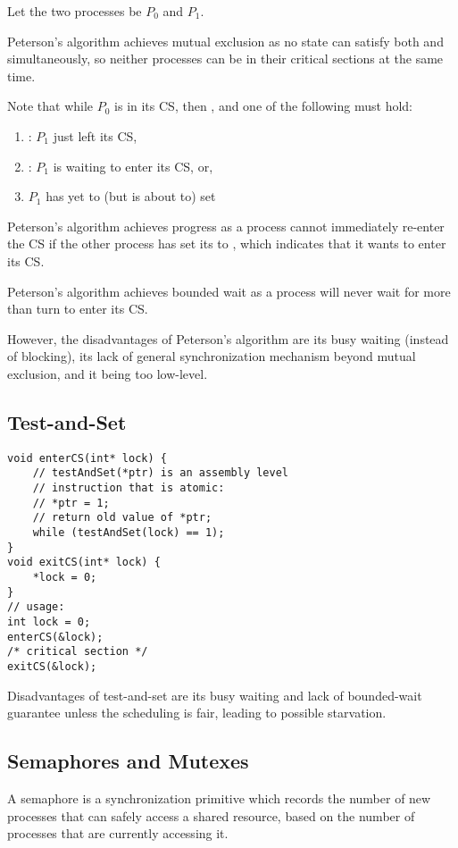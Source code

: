 Let the two processes be $P_0$ and $P_1$.

Peterson's algorithm achieves mutual exclusion as no state can satisfy both  and  simultaneously, so neither processes can be in their critical sections at the same time.

Note that while $P_0$ is in its CS, then , and one of the following must hold:
\begin{enumerate}
    \item {}: $P_1$ just left its CS,
    \item {}: $P_1$ is waiting to enter its CS, or,
    \item $P_1$ has yet to (but is about to) set 
\end{enumerate}

Peterson's algorithm achieves progress as a process cannot immediately re-enter the CS if the other process has set its  to , which indicates that it wants to enter its CS.

Peterson's algorithm achieves bounded wait as a process will never wait for more than turn to enter its CS.

However, the disadvantages of Peterson's algorithm are its busy waiting (instead of blocking), its lack of general synchronization mechanism beyond mutual exclusion, and it being too low-level.

\subsection{Test-and-Set}
\begin{lstlisting}
void enterCS(int* lock) {
    // testAndSet(*ptr) is an assembly level
    // instruction that is atomic:
    // *ptr = 1;
    // return old value of *ptr;
    while (testAndSet(lock) == 1);
}
void exitCS(int* lock) {
    *lock = 0;
}
// usage:
int lock = 0;
enterCS(&lock);
/* critical section */
exitCS(&lock);
\end{lstlisting}

Disadvantages of test-and-set are its busy waiting and lack of bounded-wait guarantee unless the scheduling is fair,
leading to possible starvation.

\subsection{Semaphores and Mutexes}
A semaphore is a synchronization primitive which records the number of new processes that can safely access a shared resource,
based on the number of processes that are currently accessing it.

